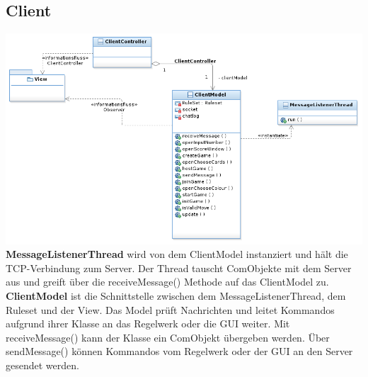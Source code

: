 \documentclass{article}
\begin{document}
\subsection{Client}
\includegraphics[width=\textwidth]{Client}
\textbf{MessageListenerThread} wird von dem ClientModel instanziert und hält die TCP-Verbindung zum Server. Der Thread tauscht ComObjekte mit dem Server aus und greift über die receiveMessage() Methode auf das ClientModel zu.
		\textbf{ClientModel} ist die Schnittstelle zwischen dem MessageListenerThread, dem Ruleset und der View. Das Model prüft Nachrichten und leitet Kommandos aufgrund ihrer Klasse an das Regelwerk oder die GUI weiter. Mit receiveMessage() kann der Klasse ein ComObjekt übergeben werden. Über sendMessage() können Kommandos vom Regelwerk oder der GUI an den Server gesendet werden.
\end{document}
